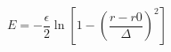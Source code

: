 \documentclass[12pt]{article}
\begin{document}
$$ 
  E = - \frac{\epsilon}{2} \ln \left[ 1 - \left(\frac{r-r0}{\Delta}\right)^2\right]
$$
\end{document}
